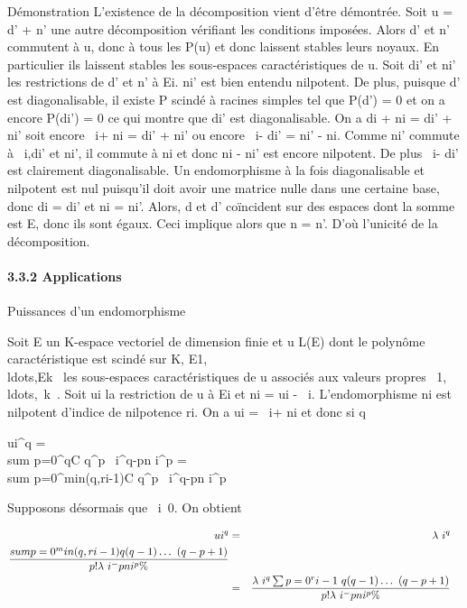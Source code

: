 Démonstration L'existence de la décomposition vient d'être démontrée.
Soit u = d' + n' une autre décomposition vérifiant les conditions
imposées. Alors d' et n' commutent à u, donc à tous les P(u) et donc
laissent stables leurs noyaux. En particulier ils laissent stables les
sous-espaces caractéristiques de u. Soit di' et ni'
les restrictions de d' et n' à Ei. ni' est bien
entendu nilpotent. De plus, puisque d' est diagonalisable, il existe P
scindé à racines simples tel que P(d') = 0 et on a encore
P(di') = 0 ce qui montre que di' est diagonalisable.
On a di + ni = di' + ni' soit
encore \lambda~i\mathrmId + ni =
di' + ni' ou encore
\lambda~i\mathrmIdEi -
di' = ni' - ni. Comme ni'
commute à
\lambda~i\mathrmIdEi,di'
et ni', il commute à ni et donc ni -
ni' est encore nilpotent. De plus
\lambda~i\mathrmId - di' est clairement
diagonalisable. Un endomorphisme à la fois diagonalisable et nilpotent
est nul puisqu'il doit avoir une matrice nulle dans une certaine base,
donc di = di' et ni = ni'.
Alors, d et d' coïncident sur des espaces dont la somme est E, donc ils
sont égaux. Ceci implique alors que n = n'. D'où l'unicité de la
décomposition.

\paragraph{3.3.2 Applications}

Puissances d'un endomorphisme

Soit E un K-espace vectoriel de dimension finie et u \in L(E) dont le
polynôme caractéristique est scindé sur K,
E1,\\ldots,Ek~
les sous-espaces caractéristiques de u associés aux valeurs propres
\lambda~1,\\ldots,\lambda~k~.
Soit ui la restriction de u à Ei et ni =
ui -
\lambda~i\mathrmIdEi.
L'endomorphisme ni est nilpotent d'indice de nilpotence
ri. On a ui =
\lambda~i\mathrmIdEi +
ni et donc si q \in {}~

ui^q = \\sum
p=0^qC q^p\lambda~
i^q-pn i^p = \\sum
p=0^min(q,ri-1)C
q^p\lambda~ i^q-pn i^p

Supposons désormais que \lambda~i\neq~0. On
obtient

\begin{align*} ui^q& =& \lambda~
i^q \\sum
p=0^min(q,ri-1) q(q -
1)\ldots~(q - p + 1) \over
p! \lambda~i^-pn i^p\%&
\\ & =& \lambda~i^q
\sum p=0^ri-1~ q(q -
1)\ldots~(q - p + 1) \over
p! \lambda~i^-pn i^p \%&
\\ \end{align*}

